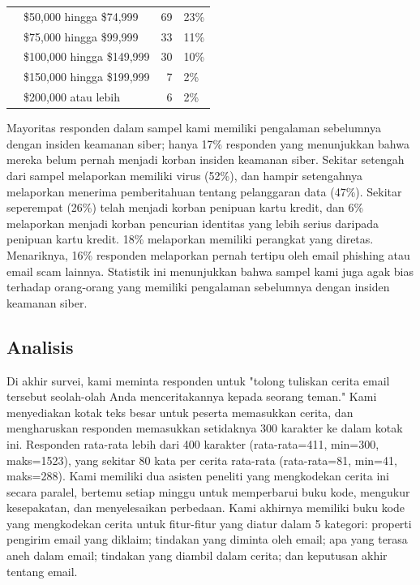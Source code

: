\documentclass[lettersize,journal]{IEEEtran}
\begin{document}
\begin{table}[h!]
\begin{tabular}{@{}llrl@{}}
                                           & \$50,000 hingga \$74,999             & 69         & 23\%        \\
                                           & \$75,000 hingga \$99,999             & 33         & 11\%        \\
                                           & \$100,000 hingga \$149,999           & 30         & 10\%        \\
                                           & \$150,000 hingga \$199,999           & 7          & 2\%         \\
                                           & \$200,000 atau lebih                & 6          & 2\%         \\ \bottomrule
  \end{tabular}
\end{table}

Mayoritas responden dalam sampel kami memiliki pengalaman sebelumnya dengan insiden keamanan siber; hanya 17\% responden yang menunjukkan bahwa mereka belum pernah menjadi korban insiden keamanan siber. Sekitar setengah dari sampel melaporkan memiliki virus (52\%), dan hampir setengahnya melaporkan menerima pemberitahuan tentang pelanggaran data (47\%). Sekitar seperempat (26\%) telah menjadi korban penipuan kartu kredit, dan 6\% melaporkan menjadi korban pencurian identitas yang lebih serius daripada penipuan kartu kredit. 18\% melaporkan memiliki perangkat yang diretas. Menariknya, 16\% responden melaporkan pernah tertipu oleh email phishing atau email scam lainnya. Statistik ini menunjukkan bahwa sampel kami juga agak bias terhadap orang-orang yang memiliki pengalaman sebelumnya dengan insiden keamanan siber.

\subsection{Analisis}

Di akhir survei, kami meminta responden untuk "tolong tuliskan cerita email tersebut seolah-olah Anda menceritakannya kepada seorang teman." Kami menyediakan kotak teks besar untuk peserta memasukkan cerita, dan mengharuskan responden memasukkan setidaknya 300 karakter ke dalam kotak ini. Responden rata-rata lebih dari 400 karakter (rata-rata=411, min=300, maks=1523), yang sekitar 80 kata per cerita rata-rata (rata-rata=81, min=41, maks=288). Kami memiliki dua asisten peneliti yang mengkodekan cerita ini secara paralel, bertemu setiap minggu untuk memperbarui buku kode, mengukur kesepakatan, dan menyelesaikan perbedaan. Kami akhirnya memiliki buku kode yang mengkodekan cerita untuk fitur-fitur yang diatur dalam 5 kategori: properti pengirim email yang diklaim; tindakan yang diminta oleh email; apa yang terasa aneh dalam email; tindakan yang diambil dalam cerita; dan keputusan akhir tentang email.
\end{document}
